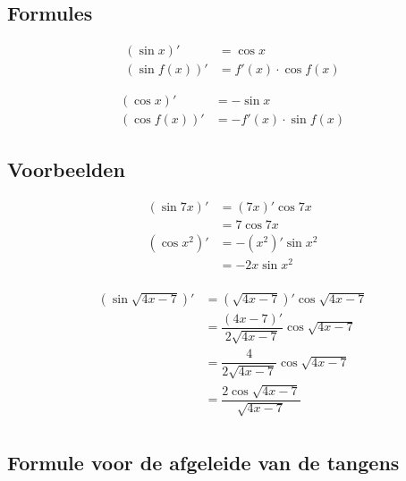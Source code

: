 \documentclass[12pt]{article}
\begin{document}
\begin{theorie}

\subsection{Formules}

\begin{minipage}{0.5\textwidth}
\begin{align*}
  \left(\sin x\right)' &= \cos x\\
  \left(\sin f(x)\right)' &= f'(x) \cdot \cos f(x)
\end{align*}
\end{minipage}
\begin{minipage}{0.5\textwidth}
\begin{align*}
  \left(\cos x\right)' &= -\sin x\\
  \left(\cos f(x)\right)' &= -f'(x) \cdot \sin f(x)
\end{align*}
\end{minipage}

\subsection{Voorbeelden}
\begin{minipage}{0.5\textwidth}
\begin{align*}
\left(\sin 7x\right)' &= (7x)' \cos 7x\\
                      &= 7 \cos 7x\\
\left(\cos x^2\right)' &= -(x^2)' \sin x^2\\
                      &= - 2x \sin x^2\\
\end{align*}
\vfill
\end{minipage}
\begin{minipage}{0.5\textwidth}
\begin{align*}
\left(\sin \sqrt{4x-7}\right)' &= \left(\sqrt{4x-7}\right)' \cos \sqrt{4x-7}\\
                               &= \dfrac{\left(4x-7\right)'}{2\sqrt{4x-7}} \cos \sqrt{4x-7}\\
                               &= \dfrac{4}{2\sqrt{4x-7}} \cos \sqrt{4x-7}\\
                               &= \dfrac{2\cos \sqrt{4x-7}}{\sqrt{4x-7}}\\
\end{align*}
\end{minipage}


\subsection{Formule voor de afgeleide van de tangens}


\end{theorie}
\end{document}
